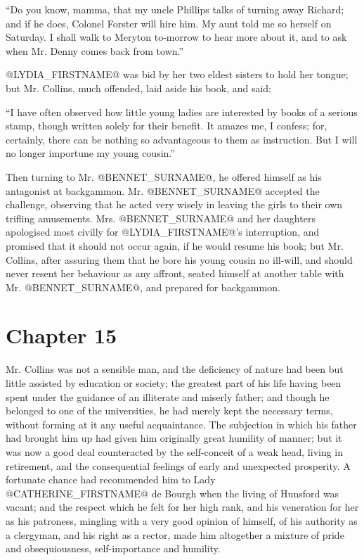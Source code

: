 ``Do you know, mamma, that my uncle Phillips talks of turning away
Richard; and if he does, Colonel Forster will hire him. My aunt told me
so herself on Saturday. I shall walk to Meryton to-morrow to hear more
about it, and to ask when Mr. Denny comes back from town.''

@LYDIA_FIRSTNAME@ was bid by her two eldest sisters to hold her tongue; but Mr.
Collins, much offended, laid aside his book, and said:

``I have often observed how little young ladies are interested by books
of a serious stamp, though written solely for their benefit. It amazes
me, I confess; for, certainly, there can be nothing so advantageous to
them as instruction. But I will no longer importune my young cousin.''

Then turning to Mr. @BENNET_SURNAME@, he offered himself as his antagonist at
backgammon. Mr. @BENNET_SURNAME@ accepted the challenge, observing that he acted
very wisely in leaving the girls to their own trifling amusements.
Mrs. @BENNET_SURNAME@ and her daughters apologised most civilly for @LYDIA_FIRSTNAME@'s
interruption, and promised that it should not occur again, if he would
resume his book; but Mr. Collins, after assuring them that he bore his
young cousin no ill-will, and should never resent her behaviour as any
affront, seated himself at another table with Mr. @BENNET_SURNAME@, and prepared
for backgammon.



\chapter*{Chapter 15}


Mr. Collins was not a sensible man, and the deficiency of nature had
been but little assisted by education or society; the greatest part
of his life having been spent under the guidance of an illiterate and
miserly father; and though he belonged to one of the universities, he
had merely kept the necessary terms, without forming at it any useful
acquaintance. The subjection in which his father had brought him up had
given him originally great humility of manner; but it was now a
good deal counteracted by the self-conceit of a weak head, living in
retirement, and the consequential feelings of early and unexpected
prosperity. A fortunate chance had recommended him to Lady @CATHERINE_FIRSTNAME@ de
Bourgh when the living of Hunsford was vacant; and the respect which
he felt for her high rank, and his veneration for her as his patroness,
mingling with a very good opinion of himself, of his authority as a
clergyman, and his right as a rector, made him altogether a mixture of
pride and obsequiousness, self-importance and humility.

